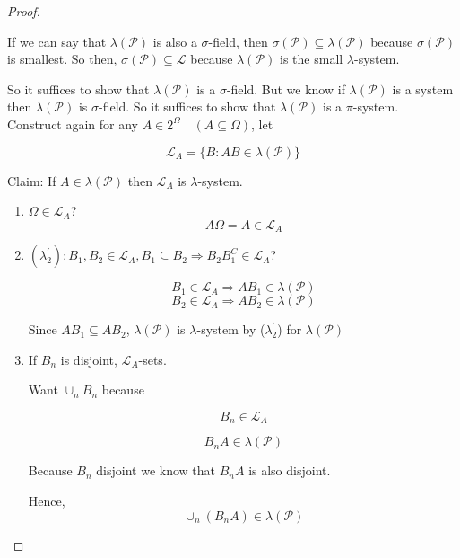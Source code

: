 \documentclass[11pt,fleqn]{book} %
\begin{document}
\begin{proof}
\begin{enumerate}
		If we can say that $\lambda(\mathscr{P})$ is also a $\sigma$-field, then $\sigma(\mathscr{P}) \subseteq \lambda(\mathscr{P})$ because $\sigma(\mathscr{P})$ is smallest. So then, $\sigma(\mathscr{P}) \subseteq \mathscr{L}$ because $\lambda(\mathscr{P})$ is the small $\lambda$-system. 

		So it suffices to show that $\lambda(\mathscr{P})$ is a $\sigma$-field. But we know if $\lambda(\mathscr{P})$ is a system then $\lambda(\mathscr{P})$ is $\sigma$-field. So it suffices to show that $\lambda(\mathscr{P})$ is a $\pi$-system.  \\

		Construct again for any $A \in 2^\Omega \quad (A \subseteq \Omega)$, let

		$$\mathscr{L}_A = \{B: AB \in \lambda(\mathscr{P}) \}$$

		Claim: If $A \in \lambda(\mathscr{P})$ then $\mathscr{L}_A$ is $\lambda$-system.\\

		\begin{enumerate}
			\item $\Omega \in \mathscr{L}_A$? 
				$$A\Omega = A \in \mathscr{L}_A$$
			\item $(\lambda_2^\prime) : B_1, B_2 \in \mathscr{L}_A, B_1 \subseteq  B_2 \Rightarrow B_2B_1^C \in \mathscr{L}_A $?

			$$B_1 \in \mathscr{L}_A \Rightarrow AB_1 \in \lambda(\mathscr{P}) $$
			$$B_2 \in \mathscr{L}_A \Rightarrow AB_2 \in \lambda(\mathscr{P}) $$

			Since $AB_1 \subseteq AB_2$, $\lambda(\mathscr{P})$ is $\lambda$-system by ($\lambda_2^\prime$) for $\lambda(\mathscr{P})$


			\item If $B_n$ is disjoint, $\mathscr{L}_A$-sets. 

			Want $\cup_n B_n$ because 

			$$B_n \in \mathscr{L}_A $$

			$$B_n A \in \lambda(\mathscr{P}) $$

			Because $B_n$ disjoint we know that $B_n A$ is also disjoint.

			Hence, 
			$$\cup_n(B_n A) \in \lambda(\mathscr{P})$$


		\end{enumerate}
	\end{enumerate}
\end{proof}

\end{document}

